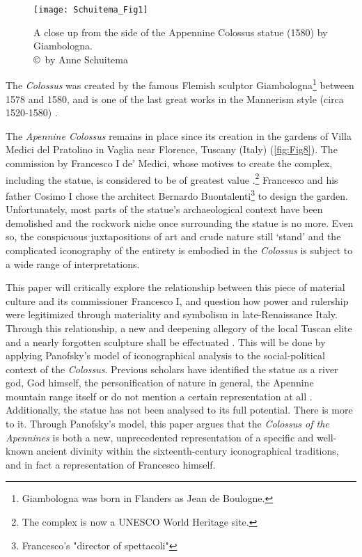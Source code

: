  \begin{figure}[!htb]
	\texttt{[image: Schuitema\_Fig1]}
	\centering
	\caption{A close up from the side of the Appennine Colossus statue (1580) by Giambologna.
		{\normalfont\scriptsize \\ \copyright\ by Anne Schuitema}
	}
	\label{fig:Fig1}
\end{figure}

The \textit{Colossus} was created by the famous Flemish sculptor Giambologna\footnote{Giambologna was born in Flanders as Jean de Boulogne.}  between 1578 and 1580, and is one of the last great works in the Mannerism style (circa 1520-1580) \parencites[68]{Burke1989}.

The \textit{Apennine Colossus} remains in place since its creation in the gardens of Villa Medici del Pratolino in Vaglia near Florence, Tuscany (Italy) (\cref{fig:Fig8}). The commission by Francesco I de’ Medici, whose motives to create the complex, including the statue, is considered to be of greatest value \parencites[16]{Walsh2015}.\footnote{The complex is now a UNESCO World Heritage site.} Francesco and his father Cosimo I chose the architect Bernardo Buontalenti\footnote{Francesco's "director of spettacoli"}  to design the garden. Unfortunately, most parts of the statue’s archaeological context have been demolished and the rockwork niche once surrounding the statue is no more. Even so, the conspicuous juxtapositions of art and crude nature still ‘stand’ and the complicated iconography of the entirety is embodied in the \textit{Colossus} is subject to a wide range of interpretations.

This paper will critically explore the relationship between this piece of material culture and its commissioner Francesco I, and question how power and rulership were legitimized through materiality and symbolism in late-Renaissance Italy. Through this relationship, a new and deepening allegory of the local Tuscan elite and a nearly forgotten sculpture shall be effectuated \parencites[164]{Meskell2009}. This will be done by applying Panofsky’s model of iconographical analysis to the social-political context of the \textit{Colossus}. Previous scholars have identified the statue as a river god, God himself, the personification of nature in general, the Apennine mountain range itself or do not mention a certain representation at all \parencites[7]{DElia2011}[31]{Sparitis2013}[70]{Lazzaro2011}. Additionally, the statue has not been analysed to its full potential. There is more to it. Through Panofsky’s model, this paper argues that the \textit{Colossus of the Apennines} is both a new, unprecedented representation of a specific and well-known ancient divinity within the sixteenth-century iconographical traditions, and in fact a representation of Francesco himself.

